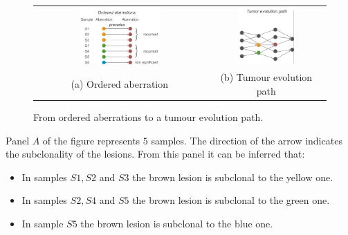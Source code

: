   \begin{figure}[H]
    \begin{tabular}{cc}
      \includegraphics[width=0.5\textwidth]{image4.png} &   \includegraphics[width=0.5\textwidth]{image5.png} \\
    (a) Ordered aberration & (b) Tumour evolution path \\[6pt]
    \end{tabular}
    \caption{From ordered aberrations to a tumour evolution path.}
    \label{fig:evolution}
  \end{figure}

  Panel $A$ of the figure represents $5$ samples.
  The direction of the arrow indicates the subclonality of the lesions.
  From this panel it can be inferred that:

  \begin{multicols}{2}
    \begin{itemize}
      \item In samples $S1, S2$ and $S3$ the brown lesion is subclonal to the yellow one.
      \item In samples $S2, S4$ and $S5$ the brown lesion is subclonal to the green one.
      \item In sample $S5$ the brown lesion is subclonal to the blue one.
    \end{itemize}
  \end{multicols}

